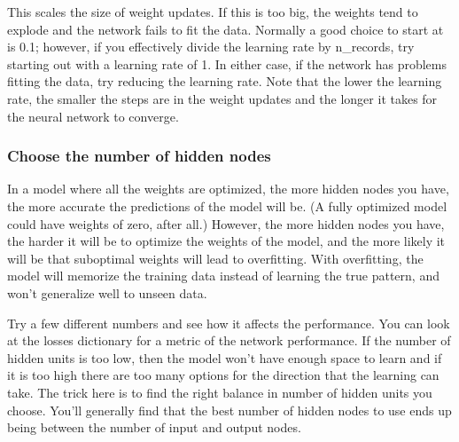 \documentclass[11pt]{article}
\begin{document}
This scales the size of weight updates. If this is too big, the weights
tend to explode and the network fails to fit the data. Normally a good
choice to start at is 0.1; however, if you effectively divide the
learning rate by n\_records, try starting out with a learning rate of 1.
In either case, if the network has problems fitting the data, try
reducing the learning rate. Note that the lower the learning rate, the
smaller the steps are in the weight updates and the longer it takes for
the neural network to converge.

\subsubsection{Choose the number of hidden
nodes}\label{choose-the-number-of-hidden-nodes}

In a model where all the weights are optimized, the more hidden nodes
you have, the more accurate the predictions of the model will be. (A
fully optimized model could have weights of zero, after all.) However,
the more hidden nodes you have, the harder it will be to optimize the
weights of the model, and the more likely it will be that suboptimal
weights will lead to overfitting. With overfitting, the model will
memorize the training data instead of learning the true pattern, and
won't generalize well to unseen data.

Try a few different numbers and see how it affects the performance. You
can look at the losses dictionary for a metric of the network
performance. If the number of hidden units is too low, then the model
won't have enough space to learn and if it is too high there are too
many options for the direction that the learning can take. The trick
here is to find the right balance in number of hidden units you choose.
You'll generally find that the best number of hidden nodes to use ends
up being between the number of input and output nodes.
\end{document}
